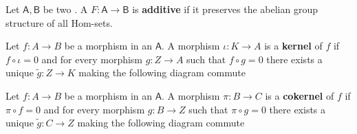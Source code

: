 \documentclass[../main.tex]{subfiles}
\begin{document}
\begin{definition} \label{def:additive-functor}
  Let \(\mathsf{A}, \mathsf{B}\) be two . A  \(F: \mathsf{A} \to \mathsf{B}\) is \textbf{additive} if it preserves the abelian group structure of all Hom-sets.
\end{definition}

\begin{definition}[Kernel] \label{def:categorical-kernel}
  Let \(f: A \to B\) be a morphism in an  \(\mathsf{A}\).
  A morphism \(\iota: K \to A\) is a \textbf{kernel} of \(f\) if \(f \circ \iota = 0\) and for every morphism \(g: Z \to A\) such that \(f \circ g = 0\) there exists a unique \(\tilde{g}:Z \to K\) making the following diagram commute
  \begin{center}
  \end{center}
\end{definition}

\begin{definition}[Cokernel] \label{def:categorical-cokernel}
  Let \(f: A \to B\) be a morphism in an  \(\mathsf{A}\).
  A morphism \(\pi: B \to C\) is a \textbf{cokernel} of \(f\) if \(\pi \circ f = 0\) and for every morphism \(g: B \to Z\) such that \(\pi \circ g = 0\) there exists a unique \(\tilde{g}:C \to Z\) making the following diagram commute
  \begin{center}
  \end{center}
\end{definition}
\end{document}
